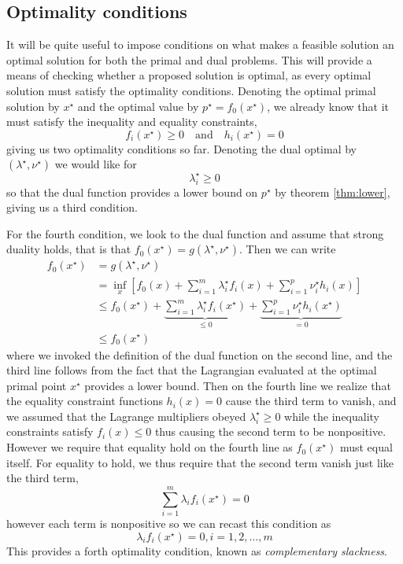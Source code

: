 \subsection{Optimality conditions} \label{ssec:KKT}
It will be quite useful to impose conditions on what makes a feasible solution an optimal solution for both the primal and dual problems. This will provide a means of checking whether a proposed solution is optimal, as every optimal solution must satisfy the optimality conditions. Denoting the optimal primal solution by $x^\star$ and the optimal value by $p^\star = f_0(x^\star)$, we already know that it must satisfy the inequality and equality constraints,
\begin{equation}
f_i(x^\star) \ge 0 \quad \mathrm{and} \quad h_i(x^\star) = 0
\end{equation}
giving us two optimality conditions so far. Denoting the dual optimal by $(\lambda^\star, \nu^\star)$ we would like for
\begin{equation}
\lambda_i^\star \ge 0
\end{equation}
so that the dual function provides a lower bound on $p^\star$ by theorem \ref{thm:lower}, giving us a third condition.

For the fourth condition, we look to the dual function and assume that strong duality holds, that is that $f_0(x^\star) = g(\lambda^\star, \nu^\star)$. Then we can write
\begin{align}
f_0(x^\star) &= g(\lambda^\star, \nu^\star) \nonumber \\
& = \inf_x \left[ f_0(x) + \sum_{i=1}^m \lambda_i^\star f_i(x) + \sum_{i=1}^p \nu_i^\star h_i(x) \right] \nonumber \\
& \le f_0(x^\star)
+ \underbrace{\sum_{i=1}^m \lambda_i^\star f_i(x^\star)}_{\le 0}
+ \underbrace{\sum_{i=1}^p \nu_i^\star h_i(x^\star)}_{=0} \nonumber \\
& \le f_0(x^\star)
\end{align}
where we invoked the definition of the dual function on the second line, and the third line follows from the fact that the Lagrangian evaluated at the optimal primal point $x^\star$ provides a lower bound. Then on the fourth line we realize that the equality constraint functions $h_i(x) = 0$ cause the third term to vanish, and we assumed that the Lagrange multipliers obeyed $\lambda_i^\star \ge 0$ while the inequality constraints satisfy $f_i(x) \le 0$ thus causing the second term to be nonpositive. However we require that equality hold on the fourth line as $f_0(x^\star)$ must equal itself. For equality to hold, we thus require that the second term vanish just like the third term,
\begin{equation}
\sum_{i=1}^m \lambda_i f_i(x^\star) = 0
\end{equation}
however each term is nonpositive so we can recast this condition as
\begin{equation}
\lambda_i f_i(x^\star) = 0, i = 1,2,\dots,m
\end{equation}
This provides a forth optimality condition, known as \emph{complementary slackness}.

